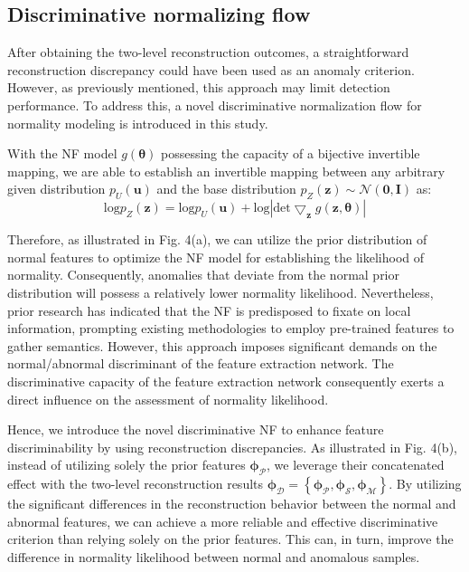 \documentclass[journal]{IEEEtran}
\begin{document}
\subsection{Discriminative normalizing flow}

After obtaining the two-level reconstruction outcomes, a straightforward reconstruction discrepancy could have been used as an anomaly criterion. However, as previously mentioned, this approach may limit detection performance. To address this, a novel discriminative normalization flow for normality modeling is introduced in this study.

With the NF model $g\left ( \boldsymbol{\theta} \right ) $ possessing the capacity of a bijective invertible mapping, we are able to establish an invertible mapping between any arbitrary given distribution $p_{U}\left ( \boldsymbol{u} \right ) $ and the base distribution $p_{Z}\left ( \boldsymbol{z} \right )\sim \mathcal{N} \left (  \boldsymbol{0}, \boldsymbol{I} \right )$ as:
\begin{equation}
\mathrm{log} p_{Z}\left ( \boldsymbol{z} \right ) = \mathrm{log} p_{U}\left ( \boldsymbol{u} \right )+\mathrm{log}\left | \mathrm{det} \bigtriangledown_{\boldsymbol{z}}g( \boldsymbol{z}, \boldsymbol{\theta}) \right | 
\end{equation}

Therefore, as illustrated in Fig. 4(a), we can utilize the prior distribution of normal features to optimize the NF model for establishing the likelihood of normality. Consequently, anomalies that deviate from the normal prior distribution will possess a relatively lower normality likelihood. Nevertheless, prior research has indicated that the NF is predisposed to fixate on local information, prompting existing methodologies to employ pre-trained features to gather semantics. However, this approach imposes significant demands on the normal/abnormal discriminant of the feature extraction network. The discriminative capacity of the feature extraction network consequently exerts a direct influence on the assessment of normality likelihood.

Hence, we introduce the novel discriminative NF to enhance feature discriminability by using reconstruction discrepancies. As illustrated in Fig. 4(b), instead of utilizing solely the prior features $\boldsymbol{\phi_{\mathcal{P}}}$, we leverage their concatenated effect with the two-level reconstruction results $ \boldsymbol{\phi_{\mathcal{D}}}= \left \{\boldsymbol{\phi_{\mathcal{P}}}, \boldsymbol{\phi_{\mathcal{S}}},\boldsymbol{\phi_{\mathcal{M}}}  \right \} $. 
By utilizing the significant differences in the reconstruction behavior between the normal and abnormal features, we can achieve a more reliable and effective discriminative criterion than relying solely on the prior features. This can, in turn, improve the difference in normality likelihood between normal and anomalous samples. 
\end{document}
